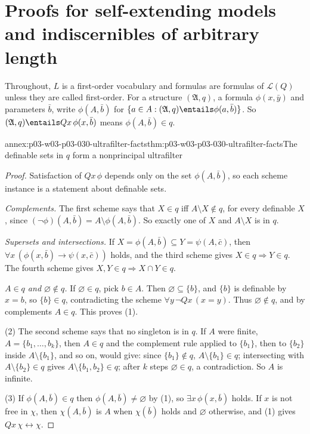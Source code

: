 \section{Proofs for self-extending models and indiscernibles of arbitrary length}
\label{sec:annex-p03-w03-p03-030-self-extending}

Throughout, \(L\) is a first-order vocabulary and formulas are formulas of
\(\mathscr L(Q)\) unless they are called first-order.  For a structure
\((\mathfrak A,q)\), a formula \(\phi(x,\bar y)\) and parameters \(\bar b\),
write \(\phi(A,\bar b)\) for \(\{a\in A:(\mathfrak A,q)\entails\phi(a,\bar
b)\}\).  So \((\mathfrak A,q)\entails Qx\,\phi(x,\bar b)\) means
\(\phi(A,\bar b)\in q\).

\begin{annexitem}{annex:p03-w03-p03-030-ultrafilter-facts}{thm:p03-w03-p03-030-ultrafilter-facts}{The definable sets in \(q\) form a nonprincipal ultrafilter}
\begin{proof}
Satisfaction of \(Qx\,\phi\) depends only on the set \(\phi(A,\bar b)\), so
each scheme instance is a statement about definable sets.

\emph{Complements.}  The first scheme says that \(X\in q\) iff
\(A\setminus X\notin q\), for every definable \(X\), since
\((\neg\phi)(A,\bar b)=A\setminus\phi(A,\bar b)\).  So exactly one of \(X\)
and \(A\setminus X\) is in \(q\).

\emph{Supersets and intersections.}  If \(X=\phi(A,\bar b)\subseteq
Y=\psi(A,\bar c)\), then \(\forall x\,(\phi(x,\bar b)\rightarrow\psi(x,\bar
c))\) holds, and the third scheme gives \(X\in q\Rightarrow Y\in q\).  The
fourth scheme gives \(X,Y\in q\Rightarrow X\cap Y\in q\).

\emph{\(A\in q\) and \(\varnothing\notin q\).}  If \(\varnothing\in q\), pick
\(b\in A\).  Then \(\varnothing\subseteq\{b\}\), and \(\{b\}\) is definable
by \(x=b\), so \(\{b\}\in q\), contradicting the scheme
\(\forall y\,\neg Qx\,(x=y)\).  Thus \(\varnothing\notin q\), and by
complements \(A\in q\).  This proves (1).

(2) The second scheme says that no singleton is in \(q\).  If \(A\) were
finite, \(A=\{b_1,\ldots,b_k\}\), then \(A\in q\) and the complement rule
applied to \(\{b_1\}\), then to \(\{b_2\}\) inside \(A\setminus\{b_1\}\),
and so on, would give: since \(\{b_1\}\notin q\), \(A\setminus\{b_1\}\in q\);
intersecting with \(A\setminus\{b_2\}\in q\) gives
\(A\setminus\{b_1,b_2\}\in q\); after \(k\) steps \(\varnothing\in q\), a
contradiction.  So \(A\) is infinite.

(3) If \(\phi(A,\bar b)\in q\) then \(\phi(A,\bar b)\ne\varnothing\) by (1),
so \(\exists x\,\phi(x,\bar b)\) holds.  If \(x\) is not free in \(\chi\),
then \(\chi(A,\bar b)\) is \(A\) when \(\chi(\bar b)\) holds and
\(\varnothing\) otherwise, and (1) gives \(Qx\,\chi\leftrightarrow\chi\).
\end{proof}
\end{annexitem}

